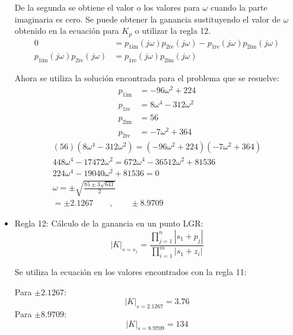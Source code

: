 \begin{itemize}
  De la segunda se obtiene el valor o los valores para $\omega$ cuando la parte imaginaria es cero. Se puede obtener la ganancia sustituyendo el valor de $\omega$ obtenido en la ecuación para $K_p$ o utilizar la regla 12.
  \begin{align*}
    0 &= p_{1\text{im}}(j\omega) p_{2\text{re}}(j\omega) -  p_{1\text{re}}(j\omega) p_{2\text{im}}(j\omega)
    \\
    p_{1\text{im}}(j\omega) p_{2\text{re}}(j\omega) &=  p_{1\text{re}}(j\omega) p_{2\text{im}}(j\omega)
  \end{align*}

  Ahora se utiliza la solución encontrada para el problema que se resuelve:
  \begin{align*}
    p_{1\text{im}} &=-96\omega^2+224
    \\
    p_{1\text{re}} &=8\omega^4-312\omega^2
    \\
    p_{2\text{im}} &=56
    \\
    p_{2\text{re}} &=-7\omega^2+364
  \end{align*}
  \begin{align*}
    (56)(8\omega^4-312\omega^2) = (-96\omega^2+224)(-7\omega^2+364)
    \\
    448\omega^4 - 17472\omega^2 = 672\omega^4 -36512\omega^2 + 81536
    \\
    224\omega^4 - 19040\omega^2 + 81536 = 0
    \\
    \omega = \pm\sqrt{\frac{85\pm3\sqrt{641}}{2}} 
    \\
    = \pm2.1267 \qquad, \qquad \pm 8.9709
  \end{align*}

  \item Regla 12: Cálculo de la ganancia en un punto LGR:
  \begin{equation*}
    |K|_{s=s_1} = \frac{\prod_{j=1}^n|s_1+p_j|}{\prod_{i=1}^m|s_1+z_i|}
  \end{equation*}

  Se utiliza la ecuación en los valores encontrados con la regla 11:
  
  Para $\pm2.1267$:
    \begin{equation*}
    |K|_{s=2.1267} = 3.76
  \end{equation*}
    Para $\pm8.9709$:
    \begin{equation*}
    |K|_{s=8.9709} = 134
  \end{equation*}


\end{itemize}
